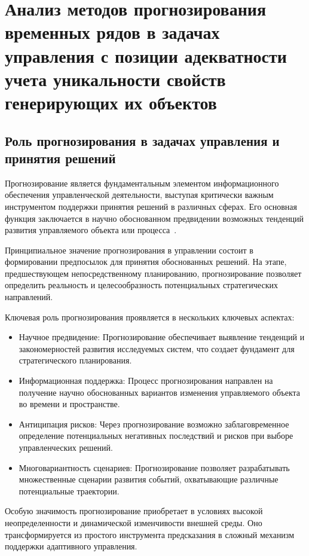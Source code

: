 \chapter{Анализ методов прогнозирования временных рядов в задачах управления с позиции адекватности учета уникальности свойств генерирующих их объектов}\label{ch:ch1}

\section{Роль прогнозирования в задачах управления и принятия решений}

Прогнозирование является фундаментальным элементом информационного обеспечения управленческой деятельности, выступая критически важным инструментом поддержки принятия решений в различных сферах. Его основная функция заключается в научно обоснованном предвидении возможных тенденций развития управляемого объекта или процесса~\cite{James2002, Green2015, DemidovMPC, GolubkovDecision2023}.

Принципиальное значение прогнозирования в управлении состоит в формировании предпосылок для принятия обоснованных решений. На этапе, предшествующем непосредственному планированию, прогнозирование позволяет определить реальность и целесообразность потенциальных стратегических направлений.

Ключевая роль прогнозирования проявляется в нескольких ключевых аспектах:
\begin{itemize}
	\item Научное предвидение: Прогнозирование обеспечивает выявление тенденций и закономерностей развития исследуемых систем, что создает фундамент для стратегического планирования.
	\item Информационная поддержка: Процесс прогнозирования направлен на получение научно обоснованных вариантов изменения управляемого объекта во времени и пространстве.
	\item Антиципация рисков: Через прогнозирование возможно заблаговременное определение потенциальных негативных последствий и рисков при выборе управленческих решений.
	\item Многовариантность сценариев: Прогнозирование позволяет разрабатывать множественные сценарии развития событий, охватывающие различные потенциальные траектории.
\end{itemize}


Особую значимость прогнозирование приобретает в условиях высокой неопределенности и динамической изменчивости внешней среды. Оно трансформируется из простого инструмента предсказания в сложный механизм поддержки адаптивного управления.

